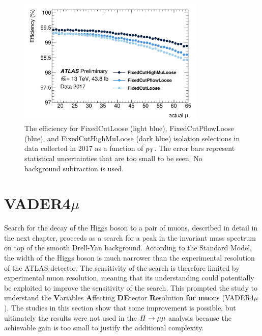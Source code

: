 \begin{figure}[h!]
  \centering
  \includegraphics[width=0.8\textwidth]{figures/muons/newwp}
  \caption[Isolation selection robust to high \pileup~conditions]
  {The efficiency for FixedCutLoose (light blue), FixedCutPflowLoose
  (blue), and FixedCutHighMuLoose (dark blue) isolation selections
  in data collected in 2017 as a function of $p_{\text{T}}$. The error bars represent
  statistical uncertainties that are too small to be seen. No background subtraction is used.
  }
  \label{fig:muon:newwp}
\end{figure}

\section{VADER4$\mu$}

Search for the decay of the Higgs boson to a pair of muons, described
in detail in the next chapter, proceeds as a search for a peak in the invariant mass spectrum on top
of the smooth Drell-Yan background. According to the Standard Model,
the width of the Higgs boson is much narrower than the experimental
resolution of the ATLAS detector. The sensitivity of the search is
therefore limited by experimental muon resolution, meaning that its
understanding could potentially be exploited
to improve the sensitivity of the search. This prompted the study to
understand the \textbf{V}ariables \textbf{A}ffecting \textbf{DE}tector
\textbf{R}esolution \textbf{for} \textbf{mu}ons (VADER4$\mu$).
The studies in this section show that some improvement is possible,
but ultimately the results were not used in the $H \rightarrow \mu\mu$ analysis
because the achievable gain is too small to justify the additional
complexity.

